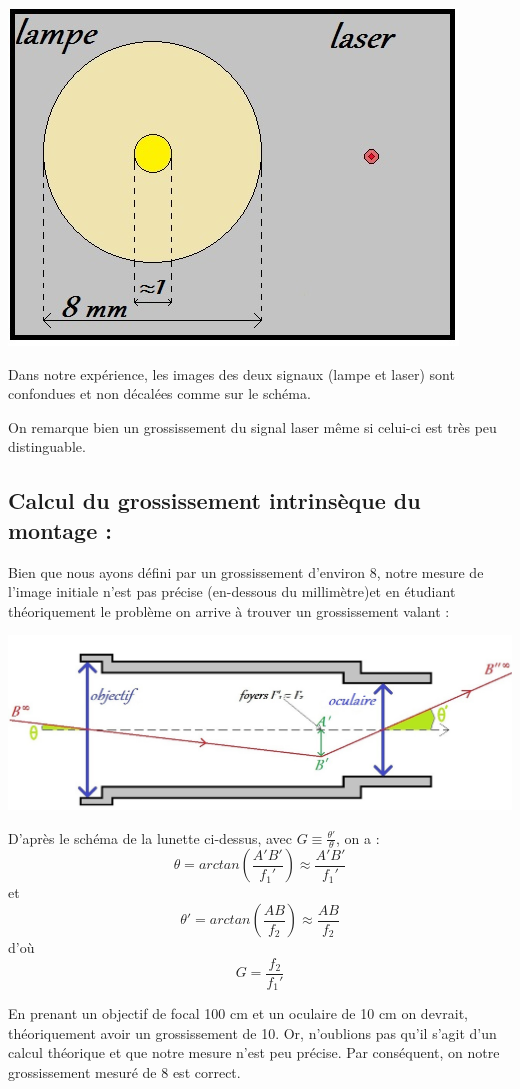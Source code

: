 \documentclass[12pt,a4paper]{article}
\begin{document}
	\begin{center}
		\includegraphics[scale=0.7]{schema2}
	\end{center}
	
	Dans notre expérience, les images des deux signaux (lampe et laser) sont confondues et non décalées comme sur le schéma.
	
	On remarque bien un grossissement du signal laser même si celui-ci est très peu distinguable.
	\subsection*{Calcul du grossissement intrinsèque du montage :}
	
	Bien que nous ayons défini par un grossissement d'environ 8, notre mesure de l'image initiale n'est pas précise (en-dessous du millimètre)et en étudiant théoriquement le problème on arrive à trouver un grossissement valant : 
	
	\includegraphics[scale=0.5]{schema4}
	
	D'après le schéma de la lunette ci-dessus, avec $ G \equiv \frac{\theta'}{\theta}$, on a :
	$$ \theta = arctan\left(\frac{A'B'}{f_{1}'}\right) \approx \frac{A'B'}{f_{1}'}$$
	et $$ \theta' = arctan\left(\frac{AB}{f_{2}}\right) \approx \frac{AB}{f_{2}}$$ 
	d'où $$ \boxed{ G = \frac{f_2}{f_1'}}$$
	
	En prenant un objectif de focal 100 cm et un oculaire de 10 cm on devrait, théoriquement avoir un grossissement de 10. Or, n'oublions pas qu'il s'agit d'un calcul théorique et que notre mesure n'est peu précise. Par conséquent, on notre grossissement mesuré de 8 est correct.
\end{document}
